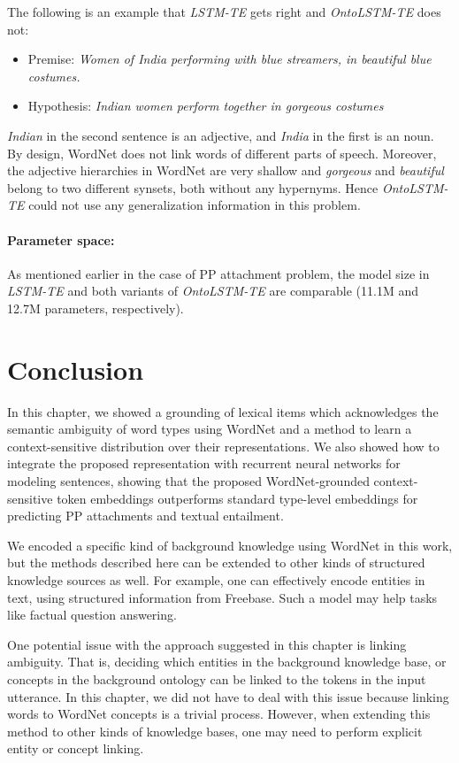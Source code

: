The following is an example that \textit{LSTM-TE} gets right and \textit{OntoLSTM-TE} does not:
\begin{itemize}
 \item Premise: \textit{Women of India performing with blue streamers, in 
beautiful blue costumes.}
 \item Hypothesis: \textit{Indian women perform together in gorgeous costumes}
\end{itemize}
\textit{Indian} in the second sentence is an adjective, and \textit{India} in 
the first is an noun. By design, WordNet does not link words of different parts 
of speech. Moreover, the adjective hierarchies in WordNet are very shallow and 
\textit{gorgeous} and \textit{beautiful} belong to two different synsets, both 
without any hypernyms. Hence \textit{OntoLSTM-TE} could not use any generalization 
information in this problem.

\paragraph{Parameter space:} As mentioned earlier in the case of PP attachment problem,
the model size in \textit{LSTM-TE} and both variants of \textit{OntoLSTM-TE} are comparable
(11.1M and 12.7M parameters, respectively).

\section{Conclusion}
In this chapter, we showed a grounding of lexical items which acknowledges the semantic ambiguity 
of word types using WordNet and a method to learn a context-sensitive distribution over their representations.
We also showed how to integrate the proposed representation with recurrent neural networks for modeling sentences,
showing that the proposed WordNet-grounded context-sensitive token embeddings outperforms standard type-level embeddings
for predicting PP attachments and textual entailment.

We encoded a specific kind of background knowledge using WordNet in this work, but the methods described here can be extended 
to other kinds of structured knowledge sources as well. For example, one can effectively encode entities in text, using structured information
from Freebase. Such a model may help tasks like factual question answering.

One potential issue with the approach suggested in this chapter is
linking ambiguity. That is, deciding which entities in the background knowledge base, or concepts in the background ontology can be linked to
the tokens in the input utterance. In this chapter, we did not have to deal with this issue because linking words to WordNet concepts is a
trivial process. However, when extending this method to other kinds of knowledge bases, one may need to perform explicit entity or concept linking.
